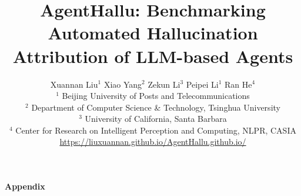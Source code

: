 \documentclass[11pt]{article}
\title{AgentHallu: Benchmarking Automated Hallucination Attribution of LLM-based Agents}
\author{Xuannan Liu$^{1}$ \quad
  Xiao Yang$^{2}$ \quad
  Zekun Li$^{3}$ \quad
  Peipei Li$^{1}$ \quad
  Ran He$^{4}$ \quad \\
  $^{1}$ Beijing University of Posts and Telecommunications \quad \\
$^{2}$ Department of Computer Science \& Technology, Tsinghua University \\
$^{3}$ University of California, Santa Barbara \quad \\
$^{4}$ Center for Research on Intelligent Perception and Computing, NLPR, CASIA
\\
\textcolor{lightred}{ \url{https://liuxuannan.github.io/AgentHallu.github.io/}}
  }
\begin{document}
\maketitle















%



\clearpage
\appendix

\begin{center}
{\Large \textbf{Appendix}}
\end{center}

\setcounter{section}{0}
\renewcommand{\thesection}{\Alph{section}}
\tableofcontents

\clearpage


\end{document}
